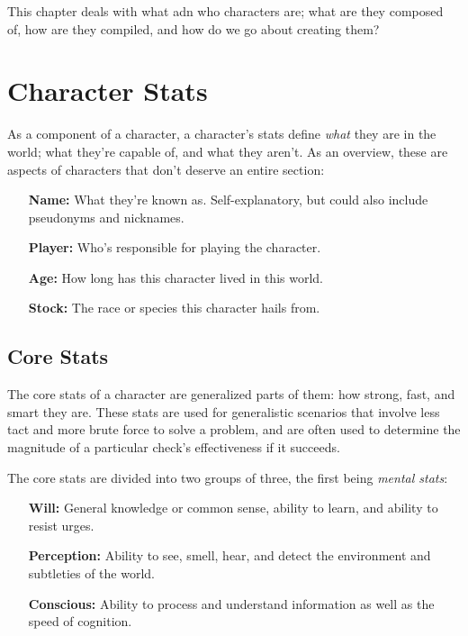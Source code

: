 \documentclass[../main.tex]{subfiles}
\begin{document}
    This chapter deals with what adn who characters are; what are they composed of, how are they compiled, and how do we go about creating them? 

    \section{Character Stats}

        As a component of a character, a character's stats define \emph{what} they are in the world; what they're capable of, and what they aren't. As an overview, these are aspects of characters that don't deserve an entire section:

        \begin{itemize}
            \item [\textbf{Name:}] What they're known as. Self-explanatory, but could also include pseudonyms and nicknames.
            \item [\textbf{Player:}] Who's responsible for playing the character.
            \item [\textbf{Age:}] How long has this character lived in this world.
            \item [\textbf{Stock:}] The race or species this character hails from.
        \end{itemize}

    \subsection{Core Stats}

        The core stats of a character are generalized parts of them: how strong, fast, and smart they are. These stats are used for generalistic scenarios that involve less tact and more brute force to solve a problem, and are often used to determine the magnitude of a particular check's effectiveness if it succeeds.

        The core stats are divided into two groups of three, the first being \emph{mental stats}:

    \begin{itemize}
        \item[ \textbf{Will:}] General knowledge or common sense, ability to learn, and ability to resist urges. 
        \item [\textbf{Perception:}] Ability to see, smell, hear, and detect the environment and subtleties of the world.
        \item [\textbf{Conscious:}] Ability to process and understand information as well as the speed of cognition.
    \end{itemize}
\end{document}
